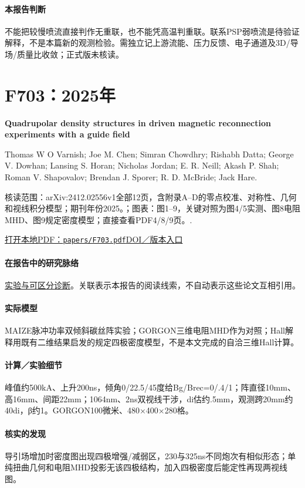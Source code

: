 \documentclass[UTF8,a4paper,11pt,openany,fontset=fandol]{ctexbook}
\begin{document}
\paragraph{本报告判断}不能把较慢喷流直接判作无重联，也不能凭高温判重联。联系PSP弱喷流是待验证解释，不是本篇新的观测检验。需独立记上游流能、压力反馈、电子通道及3D/导场/质量比收敛；正式版未核读。

\section{F703：2025年}\label{paper:F703}

\textbf{Quadrupolar density structures in driven magnetic reconnection experiments with a guide field}\citep{F703}\

Thomas W O Varnish;  Joe M. Chen;  Simran Chowdhry;  Rishabh Datta;  George V. Dowhan;  Lansing S. Horan;  Nicholas Jordan;  E. R. Neill;  Akash P. Shah;  Roman V. Shapovalov;  Brendan J. Sporer;  R. D. McBride;  Jack Hare.

\textsf{核读范围：}arXiv:2412.02556v1全部12页，含附录A–D的零点校准、对称性、几何和视线积分模型；期刊年份2025。；\textsf{图表：}图1–9，关键对照为图4/5实测、图8电阻MHD、图9规定密度模型；直接查看PDF4/8/9页。.

\href{run:../papers/F703.pdf}{打开本地PDF：\texttt{papers/F703.pdf}}\quad\href{https://doi.org/10.1063/5.0251581}{DOI／版本入口}

\paragraph{在报告中的研究脉络}\hyperref[story:diagnostic]{实验与可区分诊断}。关联表示本报告的阅读线索，不自动表示这些论文互相引用。

\paragraph{实际模型}MAIZE脉冲功率双倾斜碳丝阵实验；GORGON三维电阻MHD作为对照；Hall解释用既有二维结果启发的规定四极密度模型，不是本文完成的自洽三维Hall计算。

\paragraph{计算／实验细节}峰值约500kA、上升200ns，倾角0/22.5/45度给Bg/Brec=0/.4/1；阵直径10mm、高16mm、间距22mm；1064nm、2ns双视线干涉，di估约.5mm，观测跨20mm约40di，β约1。GORGON100微米、480×400×280格。

\paragraph{核实的发现}导引场增加时密度图出现四极增强/减弱区，230与325ns不同炮次有相似形态；单纯扭曲几何和电阻MHD投影无该四极结构，加入四极密度后能定性再现两视线图。
\end{document}
